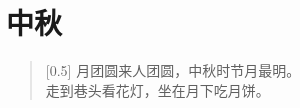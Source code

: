 \documentclass[12pt,UTF-8,openany]{ctexbook}
\begin{document}
\clearpage

\begin{center}
    
\end{center}


\hanzibox{}\hanzibox{}\hanzibox{}\hanzibox{}\hspace{1em}\hanzibox{}\hanzibox{}\hanzibox{}\hanzibox{}

\hanzibox{}\hanzibox{}\hanzibox{}\hanzibox{}\hspace{1em}\hanzibox{}\hanzibox{}\hanzibox{}\hanzibox{}

\hanzibox{}\hanzibox{}\hanzibox{}\hanzibox{}\hspace{1em}\hanzibox{}\hanzibox{}\hanzibox{}\hanzibox{}

\hanzibox{}\hanzibox{}\hanzibox{}\hanzibox{}\hspace{1em}




\chapter{中秋}

\begin{large}
    
    \begin{verse}[0.5\linewidth]
        月团圆来人团圆，中秋时节月最明。 \\
        走到巷头看花灯，坐在月下吃月饼。
    \end{verse}
    
\end{large}


\clearpage

\begin{center}
    
\end{center}


\hanzibox{}\hanzibox{}\hanzibox{}\hanzibox{}\hspace{1em}\hanzibox{}\hanzibox{}\hanzibox{}\hanzibox{}

\hanzibox{}\hanzibox{}\hanzibox{}\hanzibox{}\hspace{1em}\hanzibox{}\hanzibox{}\hanzibox{}\hanzibox{}
\end{document}
